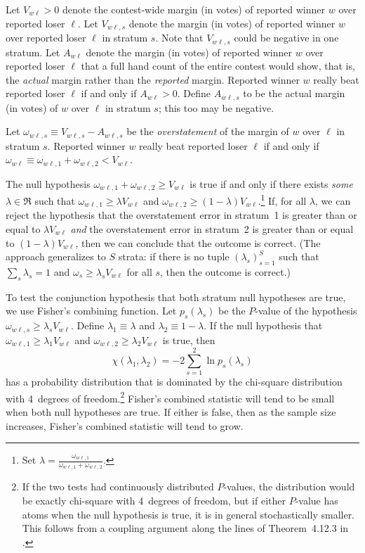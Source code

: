 \documentclass[runningheads]{llncs}
\newcommand{\beq}{\begin{equation}}
\newcommand{\eeq}{\end{equation}}
\begin{document}
Let $V_{w\ell} > 0$ denote the contest-wide margin (in votes) of reported winner 
$w$ over reported loser
$\ell$.
Let $V_{w\ell,s}$ denote the margin (in votes) of reported winner $w$ over reported loser $\ell$
in stratum $s$. 
Note that $V_{w\ell,s}$ could be negative in one stratum.
Let $A_{w\ell}$ denote the margin (in votes)
of reported winner $w$ over reported loser $\ell$ that 
a full hand count of the entire contest would show, that is, the \emph{actual} margin rather
than the \emph{reported} margin.
Reported winner $w$ really beat reported loser $\ell$ if and only if $A_{w\ell} > 0$.
Define $A_{w\ell,s}$ to be the actual margin (in votes) of $w$ over $\ell$ in stratum $s$;
this too may be negative.

Let $\omega_{w\ell,s} \equiv V_{w\ell,s} - A_{w\ell,s}$ be the \emph{overstatement}
of the margin of $w$ over $\ell$ in stratum $s$.
Reported winner $w$ really beat reported loser 
$\ell$ if and only if $\omega_{w\ell} \equiv \omega_{w\ell,1} + \omega_{w\ell,2} < V_{w\ell}$.

The null hypothesis $\omega_{w\ell, 1} + \omega_{w\ell, 2} \ge V_{w\ell}$ is true if and only if there exists \textit{some} $\lambda \in \Re$ such that 
$\omega_{w\ell, 1}\ge \lambda V_{w\ell}$ and 
$\omega_{w\ell, 2}\ge (1-\lambda) V_{w\ell}$.\footnote{%
  Set $\lambda = \frac{\omega_{w\ell, 1}}{\omega_{w\ell, 1}+\omega_{w\ell, 2}}$.
}
If, for all $\lambda$, we can reject the hypothesis that the 
overstatement error in stratum~1 is greater than or equal to $\lambda V_{w\ell}$ \emph{and} 
the overstatement error in stratum~2 is greater than or equal to $(1-\lambda) V_{w\ell}$, then
we can conclude that the outcome is correct.
(The approach generalizes to $S$ strata: if there is no tuple $( \lambda_s )_{s=1}^S$ such that
$\sum_s \lambda_s = 1$ and $\omega_s \ge \lambda_s V_{w\ell}$ for all $s$, then
the outcome is correct.)

To test the conjunction hypothesis that both stratum null hypotheses are true, we use 
Fisher's combining function.
Let $p_s(\lambda_s)$ be the $P$-value of the hypothesis $\omega_{w\ell,s} \ge \lambda_s V_{w\ell}$.
Define $\lambda_1 \equiv \lambda$ and $\lambda_2 \equiv 1-\lambda$.
If the null hypothesis that $\omega_{w\ell,1} \ge \lambda_1 V_{w\ell}$ and 
$\omega_{w\ell,2} \ge \lambda_2 V_{w\ell}$ is true, then 
\beq
   \chi(\lambda_1, \lambda_2) = -2 \sum_{s=1}^2 \ln p_s(\lambda_s)
\eeq
has a probability distribution that is dominated by the chi-square distribution with 4~degrees
of freedom.\footnote{%
   If the two tests had continuously distributed $P$-values, the distribution would be exactly
   chi-square with 4~degrees of freedom, but if either $P$-value has atoms when
   the null hypothesis is true, it is in general stochastically smaller.
   This follows from a coupling argument along the lines of Theorem~4.12.3 in \cite{grimmett01}.
}
Fisher's combined statistic will tend to be small when both null hypotheses are true.
If either is false, then as the sample size increases, Fisher's combined statistic will tend to grow.
\end{document}
